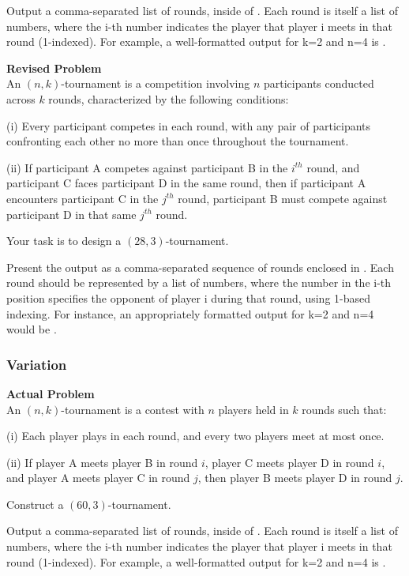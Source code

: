 Output a comma-separated list of rounds, inside of \boxed. Each round is itself a list of numbers, where the i-th number indicates the player that player i meets in that round (1-indexed). For example, a well-formatted output for k=2 and n=4 is .

\textbf{Revised Problem}\\
An $(n, k)$-tournament is a competition involving $n$ participants conducted across $k$ rounds, characterized by the following conditions:

(i) Every participant competes in each round, with any pair of participants confronting each other no more than once throughout the tournament.

(ii) If participant A competes against participant B in the $i^{th}$ round, and participant C faces participant D in the same round, then if participant A encounters participant C in the $j^{th}$ round, participant B must compete against participant D in that same $j^{th}$ round.

Your task is to design a $(28, 3)$-tournament.

Present the output as a comma-separated sequence of rounds enclosed in \boxed. Each round should be represented by a list of numbers, where the number in the i-th position specifies the opponent of player i during that round, using 1-based indexing. For instance, an appropriately formatted output for k=2 and n=4 would be .

\subsubsection{Variation}
\textbf{Actual Problem}\\
An $(n, k)$-tournament is a contest with $n$ players held in $k$ rounds such that:

(i) Each player plays in each round, and every two players meet at most once.

(ii) If player A meets player B in round $i$, player C meets player D in round $i$, and player A
meets player C in round $j$, then player B meets player D in round $j$.

Construct a $(60, 3)$-tournament. 


Output a comma-separated list of rounds, inside of \boxed. Each round is itself a list of numbers, where the i-th number indicates the player that player i meets in that round (1-indexed). For example, a well-formatted output for k=2 and n=4 is .

